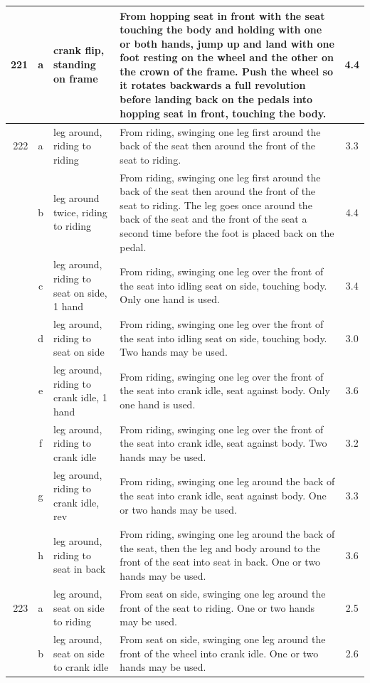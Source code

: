 \begin{longtable}{|r|c|p{4cm}|p{8cm}|c|}
\hline
221 & a & crank flip, standing on frame & From hopping seat in front with the seat touching the body and holding with one or both hands, jump up and land with one foot resting on the wheel and the other on the crown of the frame. Push the wheel so it rotates backwards a full revolution before landing back on the pedals into hopping seat in front, touching the body. & 4.4 \\ 
\hline
222 & a & leg around, riding to riding  & From riding, swinging one leg first around the back of the seat then around the front of the seat to riding.  & 3.3 \\ 
\hline
  & b & leg around twice, riding to riding  & From riding, swinging one leg first around the back of the seat then around the front of the seat to riding. The leg goes once around the back of the seat and the front of the seat a second time before the foot is placed back on the pedal. & 4.4 \\ 
\hline
  & c & leg around, riding to seat on side, 1 hand  & From riding, swinging one leg over the front of the seat into idling seat on side, touching body. Only one hand is used.  & 3.4 \\ 
\hline
  & d & leg around, riding to seat on side  & From riding, swinging one leg over the front of the seat into idling seat on side, touching body. Two hands may be used.  & 3.0 \\ 
\hline
  & e & leg around, riding to crank idle, 1 hand  & From riding, swinging one leg over the front of the seat into crank idle, seat against body. Only one hand is used. & 3.6 \\ 
\hline
  & f & leg around, riding to crank idle  & From riding, swinging one leg over the front of the seat into crank idle, seat against body. Two hands may be used. & 3.2 \\ 
\hline
  & g & leg around, riding to crank idle, rev & From riding, swinging one leg around the back of the seat into crank idle, seat against body. One or two hands may be used. & 3.3 \\ 
\hline
  & h & leg around, riding to seat in back  & From riding, swinging one leg around the back of the seat, then the leg and body around to the front of the seat into seat in back. One or two hands may be used. & 3.6 \\ 
\hline
223 & a & leg around, seat on side to riding  & From seat on side, swinging one leg around the front of the seat to riding. One or two hands may be used. & 2.5 \\ 
\hline
  & b & leg around, seat on side to crank idle  & From seat on side, swinging one leg around the front of the wheel into crank idle. One or two hands may be used.  & 2.6 \\ 

\end{longtable}
